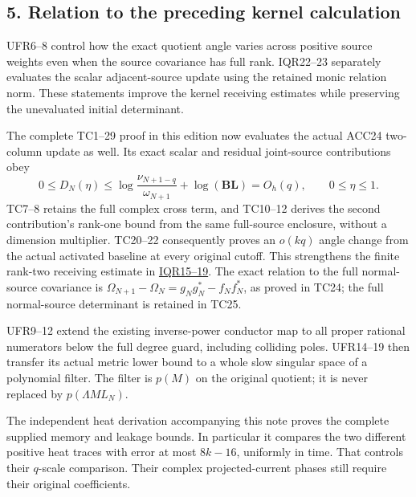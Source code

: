 \subsection{5. Relation to the preceding kernel calculation}\label{relation-to-the-preceding-kernel-calculation}

UFR6--8 control how the exact quotient angle varies across positive source weights even when the source covariance has full rank. IQR22--23 separately evaluates the scalar adjacent-source update using the retained monic relation norm. These statements improve the kernel receiving estimates while preserving the unevaluated initial determinant.

The complete TC1--29 proof in this edition now evaluates the actual ACC24 two-column update as well. Its exact scalar and residual joint-source contributions obey \[
0\le D_N(\eta)\le
\log\frac{\nu_{N+1-q}}{\omega_{N+1}}+\log(\mathbf B\mathbf L)=O_h(q),
\qquad0\le\eta\le1.                                           \tag{UFR24}
\] TC7--8 retains the full complex cross term, and TC10--12 derives the second contribution's rank-one bound from the same full-source enclosure, without a dimension multiplier. TC20--22 consequently proves an \(o(kq)\) angle change from the actual activated baseline at every original cutoff. This strengthens the finite rank-two receiving estimate in \href{https://github.com/KokunoYumeto/zeta-function-research-reader/blob/ab120cf974feb26a31d77b07458b6da52f912ea4/workbenches/splitzero-tandem/continuations/20260921-inverse-quotient/INVERSE_QUOTIENT_RECEIVERS.tex}{IQR15--19}. The exact relation to the full normal-source covariance is \(\Omega_{N+1}-\Omega_N=g_Ng_N^*-f_Nf_N^*\), as proved in TC24; the full normal-source determinant is retained in TC25.

UFR9--12 extend the existing inverse-power conductor map to all proper rational numerators below the full degree guard, including colliding poles. UFR14--19 then transfer its actual metric lower bound to a whole slow singular space of a polynomial filter. The filter is \(p(M)\) on the original quotient; it is never replaced by \(p(\Lambda ML_N)\).

The independent heat derivation accompanying this note proves the complete supplied memory and leakage bounds. In particular it compares the two different positive heat traces with error at most \(8k-16\), uniformly in time. That controls their \(q\)-scale comparison. Their complex projected-current phases still require their original coefficients.

